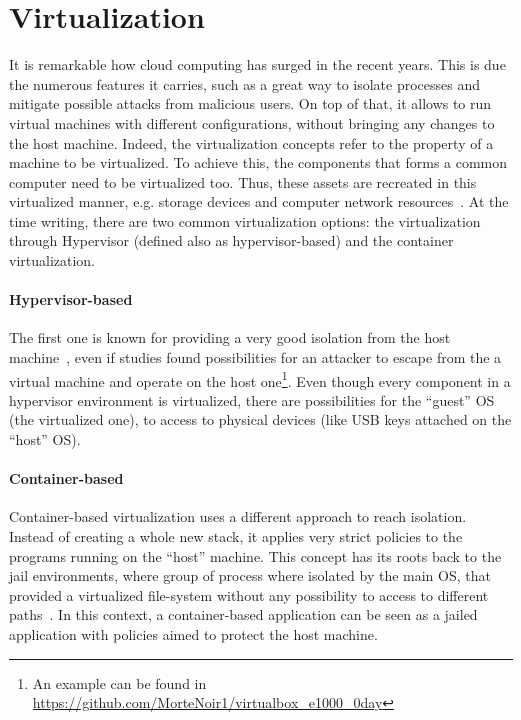 \section{Virtualization}
It is remarkable how cloud computing has surged in the recent years. This is due
the numerous features it carries, such as a great way to isolate processes and
mitigate possible attacks from malicious users. On top of that, it allows to run
virtual machines with different configurations, without bringing any changes to
the host machine. Indeed, the virtualization concepts refer to the property of
a machine to be virtualized. To achieve this, the components that forms a common
computer need to be virtualized too. Thus, these assets are recreated in this
virtualized manner, e.g. storage devices and computer network
resources~\cite{liu2014research}. At the time writing, there are two common
virtualization options: the virtualization through Hypervisor (defined also as
hypervisor-based) and the container virtualization.

\paragraph*{Hypervisor-based}
The first one is known for providing a very good isolation from the host
machine~\cite{eder2016hypervisor}, even if studies found possibilities for an
attacker to escape from the a virtual machine and operate on the host
one\footnote{An example can be found in
  \url{https://github.com/MorteNoir1/virtualbox_e1000_0day}}. Even though every
component in a hypervisor environment is virtualized, there are possibilities
for the ``guest'' OS (the virtualized one), to access to physical devices (like
USB keys attached on the ``host'' OS).

\paragraph*{Container-based}
Container-based virtualization uses a different approach to reach isolation.
Instead of creating a whole new stack, it applies very strict policies to the
programs running on the ``host'' machine. This concept has its roots back to the
jail environments, where group of process where isolated by the main OS, that
provided a virtualized file-system without any possibility to access to
different paths~\cite{canonico2007virtualization}. In this context, a
container-based application can be seen as a jailed application with policies
aimed to protect the host machine.

